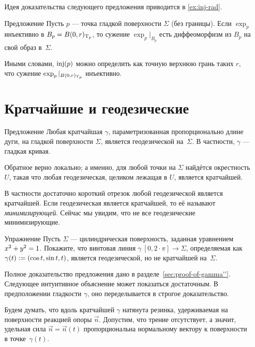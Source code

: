 Идея доказательства следующего предложения приводится в \ref{ex:inj-rad}.

\begin{thm}{Предложение}\label{prop:inj-rad}
Пусть $p$ --- точка гладкой поверхности $\Sigma$ (без границы).
Если $\exp_p$ инъективно в $B_p=B(0,r)_{\mathrm{T}_p}$, то сужение $\exp_p|_{B_p}$ есть диффеоморфизм из $B_p$ на свой образ в~$\Sigma$.
\end{thm}

Иными словами, $\mathop{\rm inj}\nolimits(p)$ можно определить как точную верхнюю грань таких $r$, что сужение $\exp_p|_{B(0,r)_{\mathrm{T}_p}}$ инъективно.

\section{Кратчайшие и геодезические}

\begin{thm}{Предложение}\label{prop:gamma''}
Любая кратчайшая $\gamma$, параметризованная пропорционально длине дуги, на гладкой поверхности $\Sigma$, является геодезической на~$\Sigma$.
В частности, $\gamma$ --- гладкая кривая.

Обратное верно локально; а именно, для любой точки на $\Sigma$ найдётся окрестность $U$, такая что любая геодезическая, целиком лежащая в $U$, является кратчайшей.
\end{thm}

В частности достаточно короткий отрезок любой геодезической является кратчайшей.
Если геодезическая является кратчайшей, то её называют \emph{минимизирующей}.
Сейчас мы увидим, что не все геодезические минимизирующие.

\begin{thm}{Упражнение}\label{ex:helix=geodesic}
Пусть $\Sigma$ --- цилиндрическая поверхность, заданная уравнением $x^2\z+y^2=1$.
Покажите, что винтовая линия $\gamma\:[0,2\cdot\pi]\to \Sigma$, определяемая как $\gamma(t)\z\df(\cos t, \sin t, t)$,
является геодезической, но не кратчайшей на~$\Sigma$.
\end{thm}

Полное доказательство предложения дано в разделе~\ref{sec:proof-of-gamma''}.
Следующее интуитивное объяснение может показаться достаточным.
В предположении гладкости $\gamma$, оно переделывается в строгое доказательство.

Будем думать, что вдоль кратчайшей $\gamma$ натянута резинка, удерживаемая на поверхности реакцией опоры $\vec n$.
Допустим, что  трение отсутствует, а значит, удельная сила $\vec n=\vec n(t)$ пропорциональна нормальному вектору к поверхности в точке~$\gamma(t)$.

